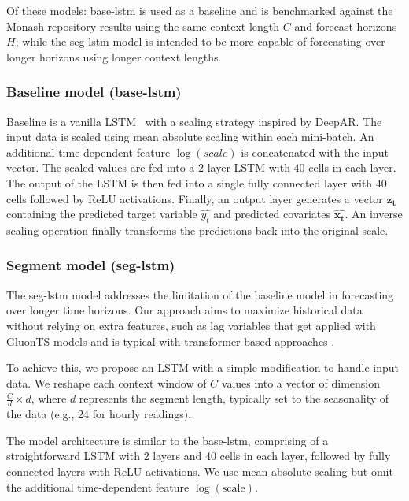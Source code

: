 \documentclass[letterpaper]{article}
\newcommand{\horizon}{H}
\newcommand{\contextlength}{C}
\begin{document}
Of these models: base-lstm is used as a baseline and is benchmarked against the Monash repository results using the same context length $\contextlength$
and forecast horizons $\horizon$; while the seg-lstm model is intended to be more capable of forecasting over longer horizons using longer context lengths.

\subsubsection{Baseline model (base-lstm)}
Baseline is a vanilla LSTM~\cite{HochSchm97} with a scaling strategy inspired by DeepAR\cite{salinas2019deepar}.
The input data is scaled using mean absolute scaling within each mini-batch. An additional time dependent feature $\log(scale)$ is concatenated with the input vector. The scaled values are fed into a $2$ layer 
LSTM with $40$ cells in each layer. The output of the LSTM is then fed into a single fully connected layer 
with $40$ cells followed by ReLU activations. Finally, an output layer generates a vector $\mathbf{z_t}$ 
containing the predicted target variable $\hat{y_t}$ and predicted covariates $\mathbf{\hat{x_t}}$.  An inverse scaling operation finally transforms 
the predictions back into the original scale.

\subsubsection{Segment model (seg-lstm)}
The seg-lstm model addresses the limitation of the baseline model in forecasting over longer time horizons. 
Our approach aims to maximize historical data without relying on extra features, such as lag variables that get applied 
with GluonTS \cite{gluonts_arxiv} models and is typical with transformer based approaches \cite{zhou2021informer,wu2022autoformer,zhang2023crossformer,kitaev2020reformer}.

To achieve this, we propose an LSTM with a simple modification to handle input data. We reshape each context window of $\contextlength$ values 
into a vector of dimension $\frac{\contextlength}{d} \times d$, where $d$ represents the segment length, typically set to the seasonality
 of the data (e.g., 24 for hourly readings).

The model architecture is similar to the base-lstm, comprising of a straightforward LSTM with 2 layers and 40 cells in each layer, followed by fully connected 
layers with ReLU activations. We use mean absolute scaling but omit the additional time-dependent feature $\log(\text{scale})$.
\end{document}
